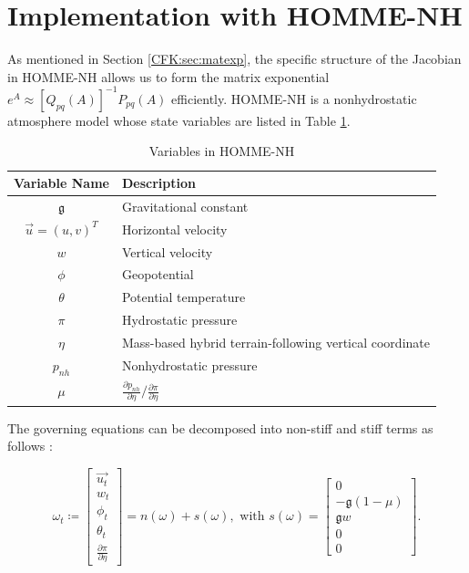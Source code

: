 \documentclass{csri19}
\newcommand{\CFKg}{\mathfrak{g}}
\begin{document}
\section{Implementation with HOMME-NH}\label{CFK:sec:homme}
As mentioned in Section \ref{CFK:sec:matexp}, the specific structure of 
the Jacobian in HOMME-NH allows us to form the matrix exponential $e^A 
\approx \left[Q_{pq}(A)\right]^{-1}P_{pq}(A)$ efficiently. HOMME-NH is a 
nonhydrostatic atmosphere model whose state variables are listed in Table 
\ref{CFK:tab:variables}. 
\begin{table}[ht]
  \caption{Variables in HOMME-NH}
  \label{CFK:tab:variables}
  \begin{center}
    \begin{tabular}{|c|l|}
      \hline
      \textbf{Variable Name} & \textbf{Description} \\
      \hline
      $\CFKg$                       & Gravitational constant                                  \\
      $\vec{u}=\left(u,v\right)^T$  & Horizontal velocity                                     \\
      $w$                           & Vertical velocity                                       \\
      $\phi$                        & Geopotential                                            \\
      $\theta$                      & Potential temperature                                   \\
      $\pi$                         & Hydrostatic pressure                                    \\
      $\eta$                        & Mass-based hybrid terrain-following vertical coordinate \\
      $p_{nh}$                      & Nonhydrostatic pressure                                 \\
      $\mu$                         & $\frac{\partial p_{nh}}{\partial\eta}/\frac{\partial\pi}{\partial\eta}$  \\
      \hline
    \end{tabular}
  \end{center}
\end{table}
The governing equations can be decomposed into non-stiff and stiff terms as follows \cite{CFK:Steyer2019}:



\[ \omega_t \coloneqq \begin{bmatrix} \vec{u_t} \\
w_t\\
\phi_t\\
\theta_t\\
\frac{\partial \pi}{\partial \eta}
\end{bmatrix} = n(\omega) + s(\omega),\text{ with }
 s(\omega) = \begin{bmatrix}
0\\
-\CFKg (1-\mu)\\
\CFKg w\\
0\\
0\end{bmatrix}.\]
\end{document}
